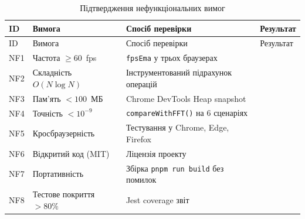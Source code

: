\begin{longtable}[]{@{}
  >{\raggedright\arraybackslash}p{}
  >{\raggedright\arraybackslash}p{}
  >{\raggedright\arraybackslash}p{}
  >{\raggedright\arraybackslash}p{}@{}}
\caption{\protect{}\label{tab:nf_verify}{}Підтвердження
нефункціональних вимог}\tabularnewline
\toprule\noalign{}
\begin{minipage}[b]{\linewidth}\raggedright
ID
\end{minipage} & \begin{minipage}[b]{\linewidth}\raggedright
Вимога
\end{minipage} & \begin{minipage}[b]{\linewidth}\raggedright
Спосіб перевірки
\end{minipage} & \begin{minipage}[b]{\linewidth}\raggedright
Результат
\end{minipage} \\
\midrule\noalign{}
\endfirsthead
\toprule\noalign{}
\begin{minipage}[b]{\linewidth}\raggedright
ID
\end{minipage} & \begin{minipage}[b]{\linewidth}\raggedright
Вимога
\end{minipage} & \begin{minipage}[b]{\linewidth}\raggedright
Спосіб перевірки
\end{minipage} & \begin{minipage}[b]{\linewidth}\raggedright
Результат
\end{minipage} \\
\midrule\noalign{}
\endhead
\bottomrule\noalign{}
\endlastfoot
NF1 & Частота \(\geq 60\)~fps & \texttt{fpsEma} у трьох браузерах & \\
NF2 & Складність \(O(N\log N)\) & Інструментований підрахунок операцій
& \\
NF3 & Пам'ять \(< 100\)~МБ & Chrome DevTools Heap snapshot & \\
NF4 & Точність \(< 10^{- 9}\) & \texttt{compareWithFFT()} на 6 сценаріях
& \\
NF5 & Кросбраузерність & Тестування у Chrome, Edge, Firefox & \\
NF6 & Відкритий код (MIT) & Ліцензія проекту & \\
NF7 & Портативність & Збірка \texttt{pnpm\ run\ build} без помилок & \\
NF8 & Тестове покриття \(> 80\%\) & Jest coverage звіт & \\
\end{longtable}

